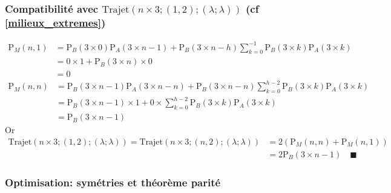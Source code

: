 \documentclass[twoside, a4paper, 12pt]{report}
\newcommand{\cqfd}[1][\quad]{\ensuremath{#1\blacksquare}}
\newcommand{\trajet}[6]{\ensuremath{\text{Trajet}\left(#1 \times #2; (#3, #4); (#5; #6)\right)}}
\newcommand{\pa}[2]{\ensuremath{\text{P}_A\left(#1 \times #2\right)}}
\newcommand{\pb}[2]{\ensuremath{\text{P}_B\left(#1 \times #2\right)}}
\newcommand{\Pm}[1]{\ensuremath{\text{P}_M\left(#1\right)}}
\begin{document}
\subsubsection{Compatibilité avec \trajet{n}{3}{1}{2}{\lambda}{\lambda} (cf  \ref{milieux_extremes})}
\begin{align}
\Pm{n, 1} &= \pb{3}{0} \pa{3}{n -1} + \pb{3}{n-h} \sum_{k=0}^{-1} \pb{3}{k} \pa{3}{k}\\
&= 0 \times 1 + \pb{3}{n} \times 0\\
&=0
\end{align}
\begin{align}
\Pm{n, n} &= \pb{3}{n-1} \pa{3}{n -n} + \pb{3}{n-n} \sum_{k=0}^{h-2} \pb{3}{k} \pa{3}{k}\\
&= \pb{3}{n-1} \times 1 + 0 \times \sum_{k=0}^{h-2} \pb{3}{k} \pa{3}{k}\\
&= \pb{3}{n-1}
\end{align}
Or
\begin{align}
\trajet{n}{3}{1}{2}{\lambda}{\lambda} = \trajet{n}{3}{n}{2}{\lambda}{\lambda} &= 2\left(\Pm{n, n} + \Pm{n, 1} \right) \\
&= 2  \pb{3}{n-1} \cqfd
\end{align}

\subsubsection{Optimisation: symétries et théorème parité}
\end{document}
